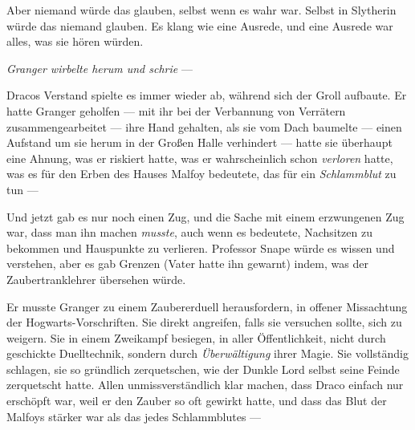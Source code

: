 Aber niemand würde das glauben, selbst wenn es wahr war. Selbst in Slytherin würde das niemand glauben. Es klang wie eine Ausrede, und eine Ausrede war alles, was sie hören würden.

\emph{Granger wirbelte herum und schrie } —

Dracos Verstand spielte es immer wieder ab, während sich der Groll aufbaute. Er hatte Granger geholfen — mit ihr bei der Verbannung von Verrätern zusammengearbeitet — ihre Hand gehalten, als sie vom Dach baumelte — einen Aufstand um sie herum in der Großen Halle verhindert — hatte sie überhaupt eine Ahnung, was er riskiert hatte, was er wahrscheinlich schon \emph{verloren} hatte, was es für den Erben des Hauses Malfoy bedeutete, das für ein \emph{Schlammblut} zu tun —

Und jetzt gab es nur noch einen Zug, und die Sache mit einem erzwungenen Zug war, dass man ihn machen \emph{musste}, auch wenn es bedeutete, Nachsitzen zu bekommen und Hauspunkte zu verlieren. Professor Snape würde es wissen und verstehen, aber es gab Grenzen (Vater hatte ihn gewarnt) indem, was der Zaubertranklehrer übersehen würde.

Er musste Granger zu einem Zaubererduell herausfordern, in offener Missachtung der Hogwarts-Vorschriften. Sie direkt angreifen, falls sie versuchen sollte, sich zu weigern. Sie in einem Zweikampf besiegen, in aller Öffentlichkeit, nicht durch geschickte Duelltechnik, sondern durch \emph{Überwältigung} ihrer Magie. Sie vollständig schlagen, sie so gründlich zerquetschen, wie der Dunkle Lord selbst seine Feinde zerquetscht hatte. Allen unmissverständlich klar machen, dass Draco einfach nur erschöpft war, weil er den Zauber so oft gewirkt hatte, und dass das Blut der Malfoys stärker war als das jedes Schlammblutes —

